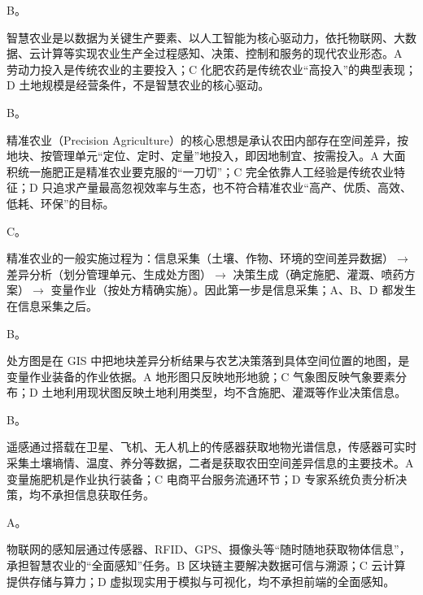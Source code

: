 \documentclass[a4paper,11pt]{article}
\begin{document}


\q B。\begin{analysis}智慧农业是以数据为关键生产要素、以人工智能为核心驱动力，依托物联网、大数据、云计算等实现农业生产全过程感知、决策、控制和服务的现代农业形态。A 劳动力投入是传统农业的主要投入；C 化肥农药是传统农业“高投入”的典型表现；D 土地规模是经营条件，不是智慧农业的核心驱动。\end{analysis}

\q B。\begin{analysis}精准农业（Precision Agriculture）的核心思想是承认农田内部存在空间差异，按地块、按管理单元“定位、定时、定量”地投入，即因地制宜、按需投入。A 大面积统一施肥正是精准农业要克服的“一刀切”；C 完全依靠人工经验是传统农业特征；D 只追求产量最高忽视效率与生态，也不符合精准农业“高产、优质、高效、低耗、环保”的目标。\end{analysis}

\q C。\begin{analysis}精准农业的一般实施过程为：信息采集（土壤、作物、环境的空间差异数据）$\rightarrow$ 差异分析（划分管理单元、生成处方图）$\rightarrow$ 决策生成（确定施肥、灌溉、喷药方案）$\rightarrow$ 变量作业（按处方精确实施）。因此第一步是信息采集；A、B、D 都发生在信息采集之后。\end{analysis}

\q B。\begin{analysis}处方图是在 GIS 中把地块差异分析结果与农艺决策落到具体空间位置的地图，是变量作业装备的作业依据。A 地形图只反映地形地貌；C 气象图反映气象要素分布；D 土地利用现状图反映土地利用类型，均不含施肥、灌溉等作业决策信息。\end{analysis}

\q B。\begin{analysis}遥感通过搭载在卫星、飞机、无人机上的传感器获取地物光谱信息，传感器可实时采集土壤墒情、温度、养分等数据，二者是获取农田空间差异信息的主要技术。A 变量施肥机是作业执行装备；C 电商平台服务流通环节；D 专家系统负责分析决策，均不承担信息获取任务。\end{analysis}

\q A。\begin{analysis}物联网的感知层通过传感器、RFID、GPS、摄像头等“随时随地获取物体信息”，承担智慧农业的“全面感知”任务。B 区块链主要解决数据可信与溯源；C 云计算提供存储与算力；D 虚拟现实用于模拟与可视化，均不承担前端的全面感知。\end{analysis}
\end{document}

